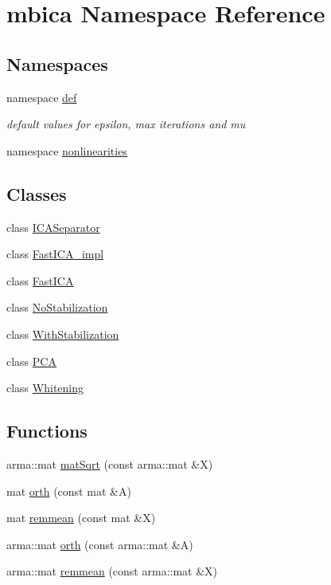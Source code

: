 \hypertarget{namespacembica}{
\section{mbica Namespace Reference}
\label{namespacembica}
}
\subsection*{Namespaces}
\begin{DoxyCompactItemize}
\item 
namespace \hyperlink{namespacembica_1_1def}{def}


\begin{DoxyCompactList}\small\item\em default values for epsilon, max iterations and mu \item\end{DoxyCompactList}

\item 
namespace \hyperlink{namespacembica_1_1nonlinearities}{nonlinearities}
\end{DoxyCompactItemize}
\subsection*{Classes}
\begin{DoxyCompactItemize}
\item 
class \hyperlink{classmbica_1_1_i_c_a_separator}{ICASeparator}
\item 
class \hyperlink{classmbica_1_1_fast_i_c_a__impl}{FastICA\_\-impl}
\item 
class \hyperlink{classmbica_1_1_fast_i_c_a}{FastICA}
\item 
class \hyperlink{classmbica_1_1_no_stabilization}{NoStabilization}
\item 
class \hyperlink{classmbica_1_1_with_stabilization}{WithStabilization}
\item 
class \hyperlink{classmbica_1_1_p_c_a}{PCA}
\item 
class \hyperlink{classmbica_1_1_whitening}{Whitening}
\end{DoxyCompactItemize}
\subsection*{Functions}
\begin{DoxyCompactItemize}
\item 
arma::mat \hyperlink{namespacembica_aaae76245138008e4273a14d7420dda92}{matSqrt} (const arma::mat \&X)
\item 
mat \hyperlink{namespacembica_a9c3ca1cf4775304c759dd9f4cc6399a5}{orth} (const mat \&A)
\item 
mat \hyperlink{namespacembica_a0e4a65ca8a44628381f8a4d2c3842575}{remmean} (const mat \&X)
\item 
arma::mat \hyperlink{namespacembica_aa8d8022a6cb5803e1d3a53f6f52fd8bb}{orth} (const arma::mat \&A)
\item 
arma::mat \hyperlink{namespacembica_ac306e82333221407e02b0fbf41dcbe4d}{remmean} (const arma::mat \&X)
\end{DoxyCompactItemize}


